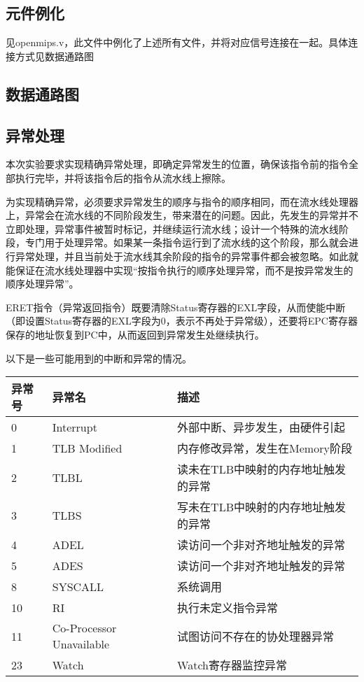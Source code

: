 \subsection{元件例化}
见openmips.v，此文件中例化了上述所有文件，并将对应信号连接在一起。具体连接方式见数据通路图
\subsection{数据通路图}

\subsection{异常处理}
本次实验要求实现精确异常处理，即确定异常发生的位置，确保该指令前的指令全部执行完毕，并将该指令后的指令从流水线上擦除。

为实现精确异常，必须要求异常发生的顺序与指令的顺序相同，而在流水线处理器上，异常会在流水线的不同阶段发生，带来潜在的问题。因此，先发生的异常并不立即处理，异常事件被暂时标记，并继续运行流水线；设计一个特殊的流水线阶段，专门用于处理异常。如果某一条指令运行到了流水线的这个阶段，那么就会进行异常处理，并且当前处于流水线其余阶段的指令的异常事件都会被忽略。如此就能保证在流水线处理器中实现“按指令执行的顺序处理异常，而不是按异常发生的顺序处理异常”。

ERET指令（异常返回指令）既要清除Status寄存器的EXL字段，从而使能中断（即设置Status寄存器的EXL字段为0，表示不再处于异常级），还要将EPC寄存器保存的地址恢复到PC中，从而返回到异常发生处继续执行。

以下是一些可能用到的中断和异常的情况。

\begin{table}[H]
	\centering
	\begin{tabular}{lll}
		\hline
		异常号&异常名&描述\\
		\hline
		0&Interrupt&外部中断、异步发生，由硬件引起\\
		1&TLB Modified&内存修改异常，发生在Memory阶段\\
		2&TLBL&读未在TLB中映射的内存地址触发的异常\\
		3&TLBS&写未在TLB中映射的内存地址触发的异常\\
		4&ADEL&读访问一个非对齐地址触发的异常\\
		5&ADES&读访问一个非对齐地址触发的异常\\
		8&SYSCALL&系统调用\\
		10&RI&执行未定义指令异常\\
		11&Co-Processor Unavailable&试图访问不存在的协处理器异常\\
		23&Watch&Watch寄存器监控异常\\
		\hline
	\end{tabular}
\end{table}

